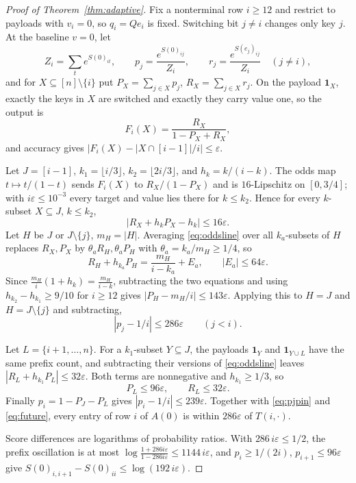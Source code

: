 \documentclass[10pt]{article}
\theoremstyle{definition}
\newcommand{\one}{\mathbf 1}
\begin{document}
\begin{proof}[Proof of Theorem~\ref{thm:adaptive}]
Fix a nonterminal row \(i\ge12\) and restrict to payloads with \(v_i=0\), so
\(q_i=Qe_i\) is fixed.  Switching bit \(j\ne i\) changes only key \(j\).  At
the baseline \(v=0\), let
\[
 Z_i=\sum_t e^{S(0)_{it}},\qquad
 p_j=\frac{e^{S(0)_{ij}}}{Z_i},\qquad
 r_j=\frac{e^{S(e_j)_{ij}}}{Z_i}\quad(j\ne i),
\]
and for \(X\subseteq[n]\setminus\{i\}\) put
\(P_X=\sum_{j\in X}p_j\), \(R_X=\sum_{j\in X}r_j\).  On the payload
\(\one_X\), exactly the keys in \(X\) are switched and exactly they carry
value one, so the output is
\begin{equation}\label{eq:face}
 F_i(X)=\frac{R_X}{1-P_X+R_X},
\end{equation}
and accuracy gives \(|F_i(X)-|X\cap[i-1]|/i|\le\varepsilon\).

Let \(J=[i-1]\), \(k_1=\lfloor i/3\rfloor\), \(k_2=\lfloor2i/3\rfloor\), and
\(h_k=k/(i-k)\).  The odds map \(t\mapsto t/(1-t)\) sends \(F_i(X)\) to
\(R_X/(1-P_X)\) and is \(16\)-Lipschitz on \([0,3/4]\); with
\(i\varepsilon\le10^{-3}\) every target and value lies there for
\(k\le k_2\).  Hence for every \(k\)-subset \(X\subseteq J\), \(k\le k_2\),
\begin{equation}\label{eq:oddsline}
 |R_X+h_kP_X-h_k|\le16\varepsilon .
\end{equation}
Let \(H\) be \(J\) or \(J\setminus\{j\}\), \(m_H=|H|\).  Averaging
\eqref{eq:oddsline} over all \(k_a\)-subsets of \(H\) replaces
\(R_X,P_X\) by \(\theta_aR_H,\theta_aP_H\) with
\(\theta_a=k_a/m_H\ge1/4\), so
\[
 R_H+h_{k_a}P_H=\frac{m_H}{i-k_a}+E_a,\qquad|E_a|\le64\varepsilon .
\]
Since \(\frac{m_H}{i}(1+h_k)=\frac{m_H}{i-k}\), subtracting the two
equations and using \(h_{k_2}-h_{k_1}\ge9/10\) for \(i\ge12\) gives
\(|P_H-m_H/i|\le143\varepsilon\).  Applying this to \(H=J\) and
\(H=J\setminus\{j\}\) and subtracting,
\begin{equation}\label{eq:pjpin}
 |p_j-1/i|\le286\varepsilon\qquad(j<i).
\end{equation}

Let \(L=\{i+1,\ldots,n\}\).  For a \(k_1\)-subset \(Y\subseteq J\), the
payloads \(\one_Y\) and \(\one_{Y\cup L}\) have the same prefix count, and
subtracting their versions of \eqref{eq:oddsline} leaves
\(|R_L+h_{k_1}P_L|\le32\varepsilon\).  Both terms are nonnegative and
\(h_{k_1}\ge1/3\), so
\begin{equation}\label{eq:future}
 P_L\le96\varepsilon,\qquad R_L\le32\varepsilon .
\end{equation}
Finally \(p_i=1-P_J-P_L\) gives \(|p_i-1/i|\le239\varepsilon\).  Together
with \eqref{eq:pjpin} and \eqref{eq:future}, every entry of row \(i\) of
\(A(0)\) is within \(286\varepsilon\) of \(T(i,\cdot)\).

Score differences are logarithms of probability ratios.  With
\(286\,i\varepsilon\le1/2\), the prefix oscillation is at most
\(\log\frac{1+286i\varepsilon}{1-286i\varepsilon}\le1144\,i\varepsilon\),
and \(p_i\ge1/(2i)\), \(p_{i+1}\le96\varepsilon\) give
\(S(0)_{i,i+1}-S(0)_{ii}\le\log(192\,i\varepsilon)\).
\end{proof}
\end{document}
